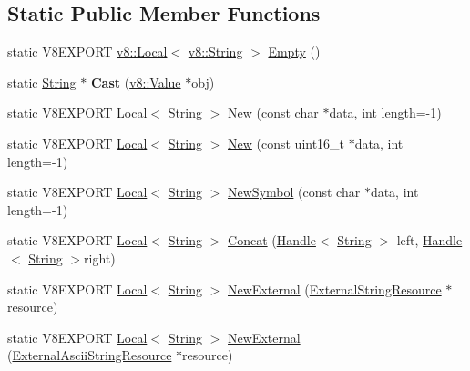 \subsection*{Static Public Member Functions}
\begin{DoxyCompactItemize}
\item 
static V8\+E\+X\+P\+O\+R\+T \hyperlink{classv8_1_1_local}{v8\+::\+Local}$<$ \hyperlink{classv8_1_1_string}{v8\+::\+String} $>$ \hyperlink{classv8_1_1_string_a148c0f01dca1c477eba42717068a2c7e}{Empty} ()
\item 
\hypertarget{classv8_1_1_string_a826d60798dc152cea64a7636737b03b9}{}static \hyperlink{classv8_1_1_string}{String} $\ast$ {\bfseries Cast} (\hyperlink{classv8_1_1_value}{v8\+::\+Value} $\ast$obj)\label{classv8_1_1_string_a826d60798dc152cea64a7636737b03b9}

\item 
static V8\+E\+X\+P\+O\+R\+T \hyperlink{classv8_1_1_local}{Local}$<$ \hyperlink{classv8_1_1_string}{String} $>$ \hyperlink{classv8_1_1_string_af0f9c44d85056bd575c01e8be7cc1b01}{New} (const char $\ast$data, int length=-\/1)
\item 
static V8\+E\+X\+P\+O\+R\+T \hyperlink{classv8_1_1_local}{Local}$<$ \hyperlink{classv8_1_1_string}{String} $>$ \hyperlink{classv8_1_1_string_a0a2f209db9234477210b8dbf50d50048}{New} (const uint16\+\_\+t $\ast$data, int length=-\/1)
\item 
static V8\+E\+X\+P\+O\+R\+T \hyperlink{classv8_1_1_local}{Local}$<$ \hyperlink{classv8_1_1_string}{String} $>$ \hyperlink{classv8_1_1_string_a496a7a6bb043ae49da105e2648e26c20}{New\+Symbol} (const char $\ast$data, int length=-\/1)
\item 
static V8\+E\+X\+P\+O\+R\+T \hyperlink{classv8_1_1_local}{Local}$<$ \hyperlink{classv8_1_1_string}{String} $>$ \hyperlink{classv8_1_1_string_ab561c791f3ea409a969c3785ce6996c5}{Concat} (\hyperlink{classv8_1_1_handle}{Handle}$<$ \hyperlink{classv8_1_1_string}{String} $>$ left, \hyperlink{classv8_1_1_handle}{Handle}$<$ \hyperlink{classv8_1_1_string}{String} $>$right)
\item 
static V8\+E\+X\+P\+O\+R\+T \hyperlink{classv8_1_1_local}{Local}$<$ \hyperlink{classv8_1_1_string}{String} $>$ \hyperlink{classv8_1_1_string_a4de1bc36a0c6fe52d12726b85d0853f1}{New\+External} (\hyperlink{classv8_1_1_string_1_1_external_string_resource}{External\+String\+Resource} $\ast$resource)
\item 
static V8\+E\+X\+P\+O\+R\+T \hyperlink{classv8_1_1_local}{Local}$<$ \hyperlink{classv8_1_1_string}{String} $>$ \hyperlink{classv8_1_1_string_a07c47bf675b802c550984fa24511a589}{New\+External} (\hyperlink{classv8_1_1_string_1_1_external_ascii_string_resource}{External\+Ascii\+String\+Resource} $\ast$resource)

\end{DoxyCompactItemize}
